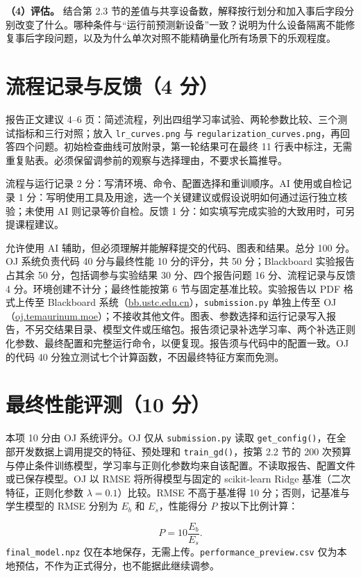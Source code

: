 \documentclass[11pt,a4paper]{article}
\newcommand{\code}[1]{{\small\nolinkurl{#1}}}
\begin{document}
\textbf{（4）评估。} 结合第 2.3 节的差值与共享设备数，解释按行划分和加入事后字段分别改变了什么。哪种条件与“运行前预测新设备”一致？说明为什么设备隔离不能修复事后字段问题，以及为什么单次对照不能精确量化所有场景下的乐观程度。


\section{流程记录与反馈（4 分）}
报告正文建议 4--6 页：简述流程，列出四组学习率试验、两轮参数比较、三个测试指标和三行对照；放入 \code{lr_curves.png} 与 \code{regularization_curves.png}，再回答四个问题。初始检查曲线可放附录，第一轮结果可在最终 11 行表中标注，无需重复贴表。必须保留调参前的观察与选择理由，不要求长篇推导。

流程与运行记录 2 分：写清环境、命令、配置选择和重训顺序。AI 使用或自检记录 1 分：写明使用工具及用途，选一个关键建议或假设说明如何通过运行独立核验；未使用 AI 则记录等价自检。反馈 1 分：如实填写完成实验的大致用时，可另提课程建议。

允许使用 AI 辅助，但必须理解并能解释提交的代码、图表和结果。总分 100 分。OJ 系统负责代码 40 分与最终性能 10 分的评分，共 50 分；Blackboard 实验报告占其余 50 分，包括调参与实验结果 30 分、四个报告问题 16 分、流程记录与反馈 4 分。环境创建不计分；最终性能按第 6 节与固定基准比较。实验报告以 PDF 格式上传至 Blackboard 系统（\href{https://bb.ustc.edu.cn}{bb.ustc.edu.cn}），\code{submission.py} 单独上传至 OJ（\href{https://oj.temaurinum.moe}{oj.temaurinum.moe}）；不接收其他文件。图表、参数选择和运行记录写入报告，不另交结果目录、模型文件或压缩包。报告须记录补选学习率、两个补选正则化参数、最终配置和完整运行命令，以便复现。报告须与代码中的配置一致。OJ 的代码 40 分独立测试七个计算函数，不因最终特征方案而免测。


\section{最终性能评测（10 分）}
本项 10 分由 OJ 系统评分。OJ 仅从 \code{submission.py} 读取 \code{get_config()}，在全部开发数据上调用提交的特征、预处理和 \code{train_gd()}，按第 2.2 节的 200 次预算与停止条件训练模型，学习率与正则化参数均来自该配置。不读取报告、配置文件或已保存模型。OJ 以 RMSE 将所得模型与固定的 scikit-learn Ridge 基准（二次特征，正则化参数 $\lambda=0.1$）比较。RMSE 不高于基准得 10 分；否则，记基准与学生模型的 RMSE 分别为 $E_b$ 和 $E_s$，性能得分 $P$ 按以下比例计算：


\[
P=10\frac{E_b}{E_s}.
\]
\code{final_model.npz} 仅在本地保存，无需上传。\code{performance_preview.csv} 仅为本地预估，不作为正式得分，也不能据此继续调参。
\end{document}
